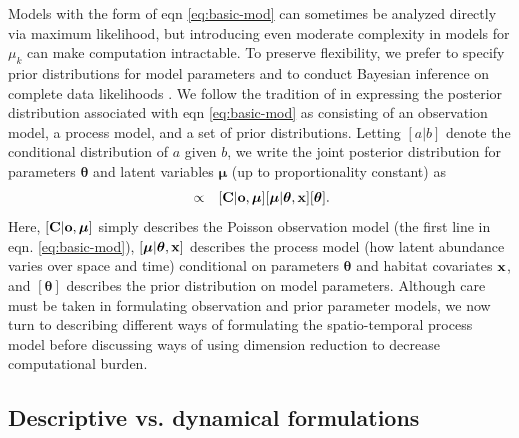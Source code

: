 \documentclass[times,mee,doublespace,]{besauth2}
\begin{document}
Models with the form of eqn \ref{eq:basic-mod} can sometimes be analyzed directly via maximum likelihood, but introducing even moderate complexity in models for $\mu_k$ can make computation intractable.  To preserve flexibility, we prefer to specify prior distributions for model parameters and to conduct Bayesian inference \citep[see e.g.][]{GelmanEtAl2004} on complete data likelihoods \citep{Dempster1977}.   We follow the tradition of \citet{Berliner1996} in expressing the posterior distribution associated with eqn \ref{eq:basic-mod} as consisting of an observation model, a process model, and a set of
prior distributions.  Letting $[a|b]$ denote the conditional distribution of $a$ given $b$, we write the joint posterior distribution for parameters $\boldsymbol{\theta}$ and latent variables $\boldsymbol{\mu}$ (up to proportionality constant) as
\begin{eqnarray}
  [\boldsymbol{\mu},\boldsymbol{\theta} | {\bf x},{\bf C},{\bf o}] & \propto & [{\bf C} | {\bf o}, \boldsymbol{\mu}] [\boldsymbol{\mu} | \boldsymbol{\theta},{\bf x}] [\boldsymbol{\theta}].
  \label{eq:hmod}
\end{eqnarray}
Here, $[{\bf C} | {\bf o}, \boldsymbol{\mu}]$ simply describes the Poisson observation model (the first line in eqn. \ref{eq:basic-mod}), $[\boldsymbol{\mu} | \boldsymbol{\theta},{\bf x}]$ describes the process model (how latent abundance varies over space and time) conditional on parameters $\boldsymbol{\theta}$ and habitat covariates ${\bf x}$, and $[\boldsymbol{\theta}]$ describes the prior distribution on model parameters.  Although care must be taken in formulating observation and prior parameter models, we now turn to describing different ways of formulating the spatio-temporal process model before discussing ways of using dimension reduction to decrease computational burden.

\subsection{Descriptive vs. dynamical formulations}
\end{document}
